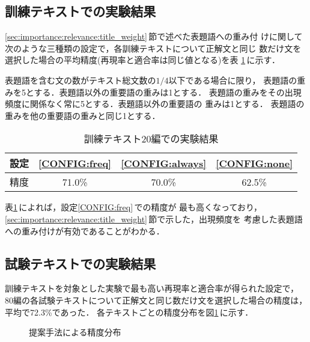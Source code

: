 \subsection{訓練テキストでの実験結果}

\ref{sec:importance:relevance:title_weight}\,節で述べた表題語への重み付
けに関して次のような三種類の設定で，各訓練テキストについて正解文と同じ
数だけ文を選択した場合の平均精度(再現率と適合率は同じ値となる)を表
\ref{tab:training}\,に示す．
\begin{CONFIG}
\config
表題語を含む文の数がテキスト総文数の$1/4$以下である場合に限り，
表題語の重みを5とする．表題語以外の重要語の重みは1とする．
\label{CONFIG:freq}
\config
表題語の重みをその出現頻度に関係なく常に5とする．表題語以外の重要語の
重みは1とする．
\label{CONFIG:always}
\config
表題語の重みを他の重要語の重みと同じ1とする．
\label{CONFIG:none}
\end{CONFIG}

\newpage

\begin{table}[htbp]
\caption{訓練テキスト20編での実験結果}
\label{tab:training}
\begin{center}
\begin{tabular}{|c||c|c|c|} \hline
設定 & \ref{CONFIG:freq} & \ref{CONFIG:always} &
\ref{CONFIG:none}\\\hline\hline 
精度 & 71.0\% & 70.0\% & 62.5\% \\\hline
\end{tabular}
\end{center}
\end{table}
表\ref{tab:training}\,によれば，設定\ref{CONFIG:freq}\,での精度が
最も高くなっており，
\ref{sec:importance:relevance:title_weight}\,節で示した，出現頻度を
考慮した表題語への重み付けが有効であることがわかる．

\subsection{試験テキストでの実験結果}

訓練テキストを対象とした実験で最も高い再現率と適合率が得られた設定で，
80編の各試験テキストについて正解文と同じ数だけ文を選択した場合の精度は，
平均で72.3\%であった．
各テキストごとの精度分布を図\ref{fig:distri}\,に示す．
\begin{figure}[htbp]
\begin{center}

\end{center}
\caption{提案手法による精度分布}
\label{fig:distri}
\end{figure}

